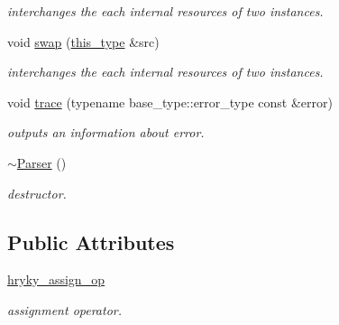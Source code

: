 \begin{DoxyCompactItemize}
\begin{DoxyCompactList}\small\item\em interchanges the each internal resources of two instances. \end{DoxyCompactList}\item 
\hypertarget{classhryky_1_1http_1_1header_1_1_parser_a827667b5e98feeb979ec0b2e3b04f54f}{void \hyperlink{classhryky_1_1http_1_1header_1_1_parser_a827667b5e98feeb979ec0b2e3b04f54f}{swap} (\hyperlink{classhryky_1_1http_1_1header_1_1_parser_aed496466ed39c1bcf709a3be673f3478}{this\-\_\-type} \&src)}\label{classhryky_1_1http_1_1header_1_1_parser_a827667b5e98feeb979ec0b2e3b04f54f}

\begin{DoxyCompactList}\small\item\em interchanges the each internal resources of two instances. \end{DoxyCompactList}\item 
\hypertarget{classhryky_1_1parser_1_1_base_a28bfa66d197bcf4babb3806bcf3abafa}{void \hyperlink{classhryky_1_1parser_1_1_base_a28bfa66d197bcf4babb3806bcf3abafa}{trace} (typename base\-\_\-type\-::error\-\_\-type const \&error)}\label{classhryky_1_1parser_1_1_base_a28bfa66d197bcf4babb3806bcf3abafa}

\begin{DoxyCompactList}\small\item\em outputs an information about error. \end{DoxyCompactList}\item 
\hypertarget{classhryky_1_1http_1_1header_1_1_parser_a2885089027a621a0ec401856af5375c2}{\hyperlink{classhryky_1_1http_1_1header_1_1_parser_a2885089027a621a0ec401856af5375c2}{$\sim$\-Parser} ()}\label{classhryky_1_1http_1_1header_1_1_parser_a2885089027a621a0ec401856af5375c2}

\begin{DoxyCompactList}\small\item\em destructor. \end{DoxyCompactList}\end{DoxyCompactItemize}
\subsection*{Public Attributes}
\begin{DoxyCompactItemize}
\item 
\hypertarget{classhryky_1_1http_1_1header_1_1_parser_ae6fc258cad5ece524092a5df9210ae8d}{\hyperlink{classhryky_1_1http_1_1header_1_1_parser_ae6fc258cad5ece524092a5df9210ae8d}{hryky\-\_\-assign\-\_\-op}}\label{classhryky_1_1http_1_1header_1_1_parser_ae6fc258cad5ece524092a5df9210ae8d}

\begin{DoxyCompactList}\small\item\em assignment operator. \end{DoxyCompactList}\end{DoxyCompactItemize}



